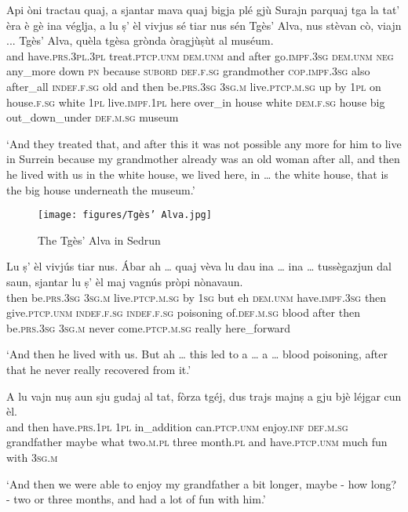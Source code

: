 \begin{linenumbers}
\gll Api òni tractau quaj, a sjantar mava quaj bigja plé gjù Surajn parquaj tga la tat’ èra è gè ina véglja, a lu ṣ’ èl vivjus sé tiar nus sén Tgès’ Alva, nus stèvan cò, viajn ... Tgès’ Alva, quèla tgèsa grònda òragjùṣùt al muséum.\\
and have.\textsc{prs.3pl.3pl} treat.\textsc{ptcp.unm} \textsc{dem.unm} and after go.\textsc{impf.3sg} \textsc{dem.unm} \textsc{neg} any\_more down \textsc{pn} because \textsc{subord} \textsc{def.f.sg} grandmother \textsc{cop.impf.3sg} also after\_all \textsc{indef.f.sg} old and then be.\textsc{prs.3sg} \textsc{3sg.m} live.\textsc{ptcp.m.sg} up by \textsc{1pl} on house.\textsc{f.sg} white \textsc{1pl} live.\textsc{impf.1pl} here over\_in {} house white \textsc{dem.f.sg} house big out\_down\_under \textsc{def.m.sg} museum\\
\end{linenumbers}
\medskip
\glt `And they treated that, and after this it was not possible any more for him to live in Surrein because my grandmother already was an old woman after all, and then he lived with us in the white house, we lived here,  in … the white house, that is the big house underneath the museum.'
\medskip

\begin{figure}
	\texttt{[image: figures/Tgès' Alva.jpg]}
	\caption{The Tgès' Alva in Sedrun}
\end{figure}

\begin{linenumbers}
\gll Lu ṣ' èl vivjús tiar nus. Ábar ah … quaj vèva lu dau ina … ina … tussègazjun dal saun, sjantar lu ṣ’ èl maj vagnús pròpi nònavaun.   \\
then be.\textsc{prs.3sg} \textsc{3sg.m} live.\textsc{ptcp.m.sg} by \textsc{1sg} but eh {} \textsc{dem.unm}  have.\textsc{impf.3sg} then give.\textsc{ptcp.unm} {} \textsc{indef.f.sg} \textsc{indef.f.sg} {} poisoning of.\textsc{def.m.sg} blood after then be.\textsc{prs.3sg} \textsc{3sg.m} never come.\textsc{ptcp.m.sg} really here\_forward \\
\end{linenumbers}
\medskip
\glt `And then he lived with us. But ah … this led to a … a … blood poisoning, after that he never really recovered  from it.'
\medskip

\begin{linenumbers}
\gll  A lu vajn nuṣ aun sju gudaj al tat, fòrza tgéj, dus trajs majnṣ a gju bjè léjgar cun èl.\\
and then have.\textsc{prs.1pl} \textsc{1pl} in\_addition can.\textsc{ptcp.unm} enjoy.\textsc{inf}  \textsc{def.m.sg} grandfather maybe what two.\textsc{m.pl} three month.\textsc{pl} and have.\textsc{ptcp.unm} much fun with \textsc{3sg.m} \\
\end{linenumbers}
\medskip
\glt `And then we were able to enjoy my grandfather a bit longer, maybe - how long? - two or three months, and had a lot of fun with him.'
\medskip

